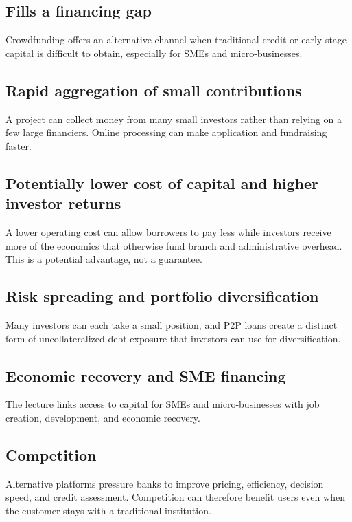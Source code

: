 \subsection{Fills a financing gap}

Crowdfunding offers an alternative channel when traditional credit or early-stage capital is difficult to obtain, especially for SMEs and micro-businesses.

\subsection{Rapid aggregation of small contributions}

A project can collect money from many small investors rather than relying on a few large financiers. Online processing can make application and fundraising faster.

\subsection{Potentially lower cost of capital and higher investor returns}

A lower operating cost can allow borrowers to pay less while investors receive more of the economics that otherwise fund branch and administrative overhead. This is a potential advantage, not a guarantee.

\subsection{Risk spreading and portfolio diversification}

Many investors can each take a small position, and P2P loans create a distinct form of uncollateralized debt exposure that investors can use for diversification.

\subsection{Economic recovery and SME financing}

The lecture links access to capital for SMEs and micro-businesses with job creation, development, and economic recovery.

\subsection{Competition}

Alternative platforms pressure banks to improve pricing, efficiency, decision speed, and credit assessment. Competition can therefore benefit users even when the customer stays with a traditional institution.

